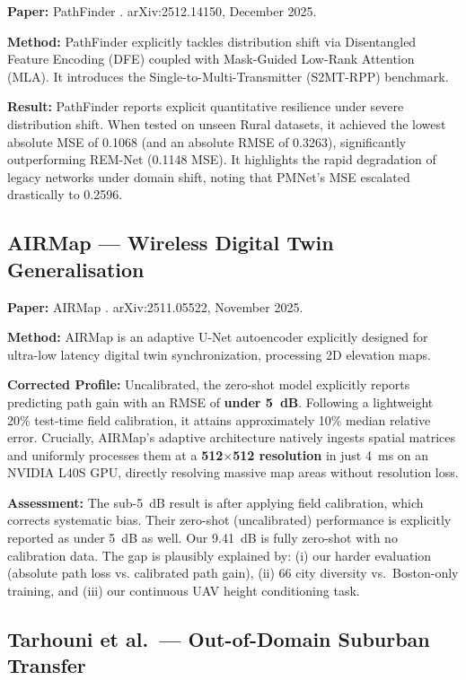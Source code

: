 \documentclass[11pt,a4paper]{article}
\begin{document}
\textbf{Paper:} PathFinder \cite{pathfinder2025}. arXiv:2512.14150, December 2025.

\textbf{Method:} PathFinder explicitly tackles distribution shift via Disentangled Feature Encoding (DFE) coupled with Mask-Guided Low-Rank Attention (MLA). It introduces the Single-to-Multi-Transmitter (S2MT-RPP) benchmark.

\textbf{Result:} PathFinder reports explicit quantitative resilience under severe distribution shift. When tested on unseen Rural datasets, it achieved the lowest absolute MSE of 0.1068 (and an absolute RMSE of 0.3263), significantly outperforming REM-Net (0.1148 MSE). It highlights the rapid degradation of legacy networks under domain shift, noting that PMNet's MSE escalated drastically to 0.2596.

\subsection{AIRMap --- Wireless Digital Twin Generalisation}

\textbf{Paper:} AIRMap \cite{airmap2025}. arXiv:2511.05522, November 2025.

\textbf{Method:} AIRMap is an adaptive U-Net autoencoder explicitly designed for ultra-low latency digital twin synchronization, processing 2D elevation maps.

\textbf{Corrected Profile:} Uncalibrated, the zero-shot model explicitly reports predicting path gain with an RMSE of \textbf{under 5~dB}. Following a lightweight 20\% test-time field calibration, it attains approximately 10\% median relative error. Crucially, AIRMap's adaptive architecture natively ingests spatial matrices and uniformly processes them at a \textbf{512$\times$512 resolution} in just 4~ms on an NVIDIA L40S GPU, directly resolving massive map areas without resolution loss.

\textbf{Assessment:} The sub-5~dB result is after applying field calibration,
which corrects systematic bias. Their zero-shot (uncalibrated) performance is explicitly reported as under 5~dB as well. Our 9.41~dB is fully zero-shot with no calibration data.
The gap is plausibly explained by: (i) our harder evaluation (absolute path loss vs.
calibrated path gain), (ii) 66 city diversity vs.\ Boston-only training, and
(iii) our continuous UAV height conditioning task.

\subsection{Tarhouni et al.\ --- Out-of-Domain Suburban Transfer}
\end{document}
